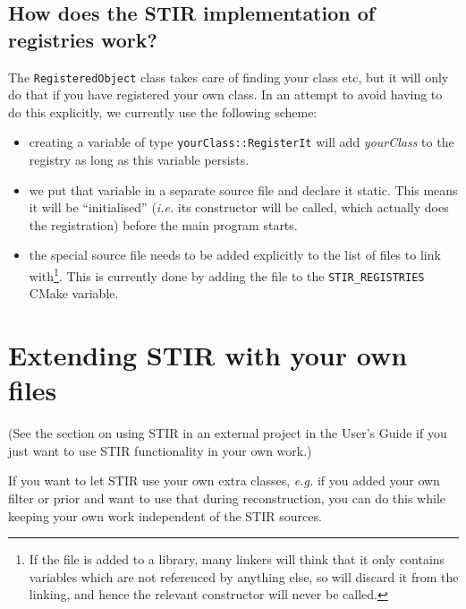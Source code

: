 \documentclass{article}
\begin{document}
\subsection{How does the STIR implementation of registries work?}
The \texttt{RegisteredObject} class takes care of finding your class etc, but it
will only do that if you have registered your own class. In an attempt to 
avoid having to do this explicitly, we currently use the following scheme:
\begin{itemize}
\item creating a variable of type \texttt{yourClass::RegisterIt} will add \textit{yourClass}
to the registry as long as this variable persists.
\item we put that variable in a separate source file and declare it static. This means it
will be ``initialised'' (\textit{i.e.} its constructor will be called, which actually does the
registration) before the main program starts.
\item the special source file needs to be added explicitly to the list of files to link with\footnote{
If the file is added to a library, many linkers will think that it only contains variables which are
not referenced by anything else, so will discard it from the linking, and hence the relevant 
constructor will never be called.}. This is currently done by adding the file to the 
\texttt{STIR\_REGISTRIES} CMake variable.
\end{itemize}

\section{
Extending STIR with your own files \label{sect:extendingSTIR}}
(See the section on using STIR in an external project in the User's Guide if you just want to
use STIR functionality in your own work.)

If you want to let STIR use your own
extra classes, \textit{e.g.} if you
added your own filter or prior and want to use that during reconstruction,
you can do this while keeping your own work independent of the STIR sources.
\end{document}

